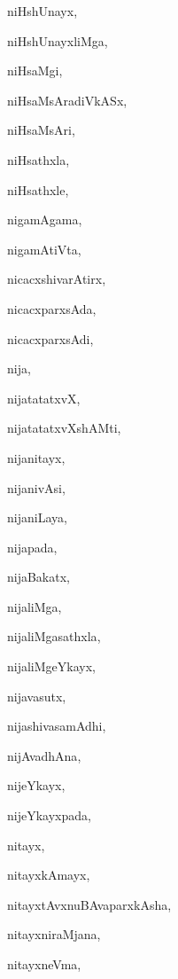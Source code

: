 \begin{multicols}{2}
{niHshUnayx}, \pageref{niHshUnayx}

{niHshUnayxliMga}, \pageref{niHshUnayxliMga}

{niHsaMgi}, \pageref{niHsaMgi}

{niHsaMsAradiVkASx}, \pageref{niHsaMsAradiVkASx}

{niHsaMsAri}, \pageref{niHsaMsAri}

{niHsathxla}, \pageref{niHsathxla}

{niHsathxle}, \pageref{niHsathxle}

{nigamAgama}, \pageref{nigamAgama}

{nigamAtiVta}, \pageref{nigamAtiVta}

{nicacxshivarAtirx}, \pageref{nicacxshivarAtirx}

{nicacxparxsAda}, \pageref{nicacxparxsAda}

{nicacxparxsAdi}, \pageref{nicacxparxsAdi}

{nija}, \pageref{nija}

{nijatatatxvX}, \pageref{nijatatatxvX}

{nijatatatxvXshAMti}, \pageref{nijatatatxvXshAMti}

{nijanitayx}, \pageref{nijanitayx}

{nijanivAsi}, \pageref{nijanivAsi}

{nijaniLaya}, \pageref{nijaniLaya}

{nijapada}, \pageref{nijapada}

{nijaBakatx}, \pageref{nijaBakatx}

{nijaliMga}, \pageref{nijaliMga}

{nijaliMgasathxla}, \pageref{nijaliMgasathxla}

{nijaliMgeYkayx}, \pageref{nijaliMgeYkayx}

{nijavasutx}, \pageref{nijavasutx}

{nijashivasamAdhi}, \pageref{nijashivasamAdhi}

{nijAvadhAna}, \pageref{nijAvadhAna}

{nijeYkayx}, \pageref{nijeYkayx}

{nijeYkayxpada}, \pageref{nijeYkayxpada}

{nitayx}, \pageref{nitayx}

{nitayxkAmayx}, \pageref{nitayxkAmayx}

{nitayxtAvxnuBAvaparxkAsha}, \pageref{nitayxtAvxnuBAvaparxkAsha}

{nitayxniraMjana}, \pageref{nitayxniraMjana}

{nitayxneVma}, \pageref{nitayxneVma}


\end{multicols}
